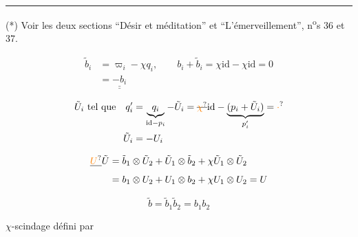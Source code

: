 \noindent\rule{.24\linewidth}{.35pt}\par
(*) Voir les deux sections ``Désir et méditation'' et ``L'émerveillement'', n\textsuperscript{o}s 36 et 37.


\[
 \begin{aligned}
 \tilde b_i&=\varpi_i-\chi q_i,\qquad b_i+\tilde b_i=\chi\mathrm{id}-\chi\mathrm{id}=0\\
 &=\underline{\underline{-b_i}}
 \end{aligned}
\]

\[
 \begin{aligned}
 \tilde U_i\ \text{tel que}\quad q'_i&=\underbrace{q_i}_{\mathrm{id}-p_i}-\tilde U_i
 =\deleted{\unsure{\chi}}\mathrm{id}-\underbrace{(p_i+\tilde U_i)}_{p'_i}=\unsure{\cdot}\\
 \tilde U_i&=-U_i
 \end{aligned}
\]

\[
 \begin{aligned}
 \deleted{\unsure{U}}\tilde U&=\tilde b_1\otimes\tilde U_2+\tilde U_1\otimes\tilde b_2+\chi\tilde U_1\otimes\tilde U_2\\
 &=b_1\otimes U_2+U_1\otimes b_2+\chi U_1\otimes U_2=U
 \end{aligned}
\]


\[
 \tilde b=\tilde b_1\tilde b_2=b_1b_2
\]


$\chi$-scindage défini  par

